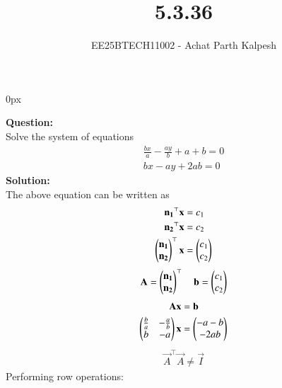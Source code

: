 \documentclass[journal]{IEEEtran}
\begin{document}

\title{5.3.36}
\author{EE25BTECH11002 - Achat Parth Kalpesh }
{\let\newpage\relax\maketitle}
\renewcommand{\thefigure}{\theenumi}
\renewcommand{\thetable}{\theenumi}
\setlength{\intextsep}{10pt} %
\renewcommand{\thetable}{\theenumi}
\parindent 0px



\textbf{Question:}\\
Solve the system of equations
\begin{align}
    \frac{bx}{a} - \frac{ay}{b} + a + b = 0\\
    bx - ay + 2ab = 0 
\end{align}
\textbf{Solution:}\\
The above equation can be written as
\begin{align}
    \mathbf{n_1}^\top \mathbf{x} &= c_1 \\
    \mathbf{n_2}^\top \mathbf{x} &= c_2 \\
    \begin{pmatrix}\mathbf{n_1}\\ \mathbf{n_2}\end{pmatrix}^\top \mathbf{x} &= \begin{pmatrix}c_1\\c_2\end{pmatrix}
\end{align}
 \begin{align}   
     \mathbf{A} = \begin{pmatrix}\mathbf{n_1}\\ \mathbf{n_2}\end{pmatrix}^\top \quad
     \mathbf{b} = \begin{pmatrix}c_1\\c_2\end{pmatrix} 
\end{align}
    \begin{align}
    \mathbf{A} \mathbf{x} &= \mathbf{b}\\
    \begin{pmatrix}\frac{b}{a} & -\frac{a}{b}\\ b & -a\end{pmatrix} \mathbf{x} &= \begin{pmatrix}-a-b\\-2ab\end{pmatrix}
\end{align}
    \begin{align}
    \vec{A}^\top \vec{A} \neq \vec{I}
\end{align}
Performing row operations:
\end{document}
